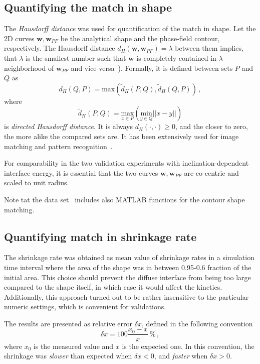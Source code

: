 \subsection{Quantifying the match in shape}
The \textit{Hausdorff distance} was used for quantification of the match in shape. Let the 2D curves $\bm{w},\bm{w}_{PF}$ be the analytical shape and the phase-field contour, respectively. The Hausdorff distance $d_H(\bm{w},\bm{w}_{PF})=\lambda$ between them implies, that $\lambda$ is the smallest number such that $ \bm{w} $ is completely contained in $\lambda$-neighborhood of $\bm{w}_{PF}$ and vice-versa~\cite{Alt2004}). Formally, it is defined between sets $P$ and $Q$ as 
\begin{equation}
	d_H(Q,P)=\mathrm{max}(\tilde{d}_H(P,Q),\tilde{d}_H(Q,P)) \,,
\end{equation}
where 
\begin{equation}
	\tilde{d}_H(P,Q)=\underset{x\in P}{\mathrm{max}}( \underset{y\in Q}{\mathrm{min}}||x-y|| )
\end{equation}
is \textit{directed Hausdorff distance}. It is always $d_H(\cdot,\cdot)\geq 0$, and the closer to zero, the more alike the compared sets are. It has been extensively used for image matching and pattern recognition~\cite{LiZhu2014}. 

For comparability in the two validation experiments with inclination-dependent interface energy, it is essential that the two curves $\bm{w},\bm{w}_{PF}$ are co-centric and scaled to unit radius.

Note tat the data set~\cite{Minar2022dataset} includes also MATLAB functions for the contour shape matching.

\subsection{Quantifying match in shrinkage rate}
The shrinkage rate was obtained as mean value of shrinkage rates in a simulation time interval where the area of the shape was in between 0.95-0.6 fraction of the initial area. This choice should prevent the diffuse interface from being too large compared to the shape itself, in which case it would affect the kinetics. Additionally, this approach turned out to be rather insensitive to the particular numeric settings, which is convenient for validations. 

The results are presented as relative error $\delta x$, defined in the following convention
\begin{equation}
	\delta x = 100 \frac{x_0-x}{x}~\%\,,
\end{equation}
where $x_0$ is the measured value and $x$ is the expected one. In this convention, the shrinkage was \textit{slower} than expected when $\delta x<0$, and \textit{faster} when $\delta x > 0$.


